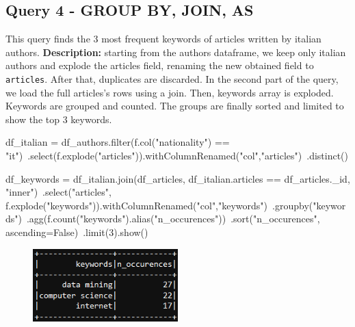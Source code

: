 \documentclass{Configuration_Files/PoliMi3i_thesis}
\begin{document}
\subsection{Query 4 - GROUP BY, JOIN, AS}
This query finds the 3 most frequent keywords of articles written by italian authors.\newline
\textbf{Description:} starting from the authors dataframe, we keep only italian authors and explode the articles field, renaming the
new obtained field to \verb |articles|. After that, duplicates are discarded.\newline
In the second part of the query, we load the full articles's rows using a join. Then, keywords array is exploded. Keywords are grouped
and counted. The groups are finally sorted and limited to show the top 3 keywords.\newline
\begin{python}
df_italian = df_authors.filter(f.col("nationality") == "it")\
                       .select(f.explode("articles")).withColumnRenamed("col","articles")\
                       .distinct()

df_keywords = df_italian.join(df_articles, df_italian.articles == df_articles._id, "inner")\
                        .select("articles", f.explode("keywords")).withColumnRenamed("col","keywords")\
                        .groupby("keywords")\
                        .agg(f.count("keywords").alias("n_occurences"))\
                        .sort("n_occurences", ascending=False)\
                        .limit(3).show()
\end{python}
\begin{figure}[H]
\centering
\includegraphics[width=0.5\textwidth]{query/spark_q4.PNG}
\label{fig:query4}
\end{figure}
\end{document}
